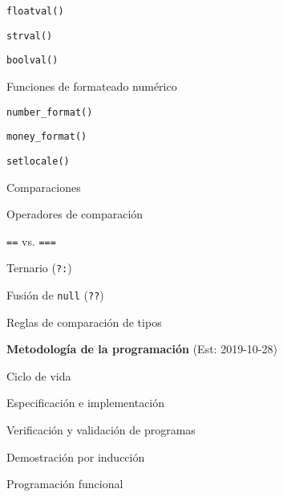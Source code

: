 \begin{longenum}
\begin{longenum}
\begin{longenum}
\begin{longenum}
\begin{longenum}
                    \item \texttt{floatval()}
                    \item \texttt{strval()}
                    \item \texttt{boolval()}
                \end{longenum}
                \item Funciones de formateado numérico
                \begin{longenum}
                    \item \texttt{number\_format()}
                    \item \texttt{money\_format()}
                    \begin{longenum}
                        \item \texttt{setlocale()}
                    \end{longenum}
                \end{longenum}
            \end{longenum}
            \item Comparaciones
            \begin{longenum}
                \item Operadores de comparación
                \item \texttt{==} vs. \texttt{===}
                \item Ternario (\texttt{?:})
                \item Fusión de \texttt{null} (\texttt{??})
                \item Reglas de comparación de tipos
            \end{longenum}
        \end{longenum}
    \end{longenum}
    \item \textbf{Metodología de la programación}  (Est: 2019-10-28)
    \begin{longenum}
        \item Ciclo de vida
        \item Especificación e implementación
        \item Verificación y validación de programas
        \begin{longenum}
            \item Demostración por inducción
        \end{longenum}
        \item Programación funcional
        \begin{longenum}

\end{longenum}
\end{longenum}
\end{longenum}
